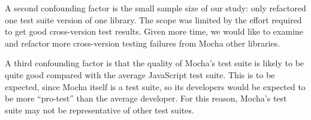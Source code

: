 A second confounding factor is the small sample size of our study:
only refactored one test suite version of one library. The scope was
limited by the effort required to get good cross-version test
results. Given more time, we would like to examine and refactor more
cross-version testing failures from Mocha other libraries.

A third confounding factor is that the quality of Mocha's test suite
is likely to be quite good compared with the average JavaScript test
suite. This is to be expected, since Mocha itself is a test suite, so
its developers would be expected to be more ``pro-test'' than the
average developer. For this reason, Mocha's test suite may not be
representative of other test suites.

